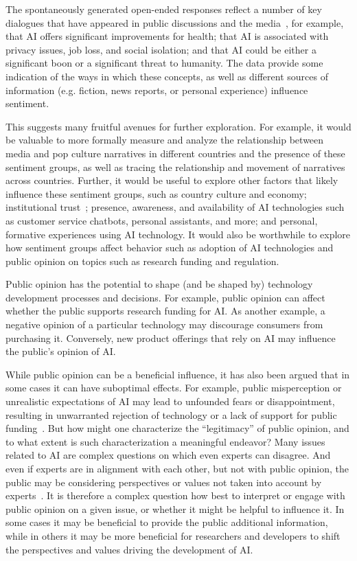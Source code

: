 \documentclass[11pt]{article} %
\begin{document}
The spontaneously generated open-ended responses reflect a number of key dialogues that have appeared in public discussions and the media~\cite{cave2018portrayals,chuan2019,stone2016artificial,ouchchy2020}, for example, that AI offers significant improvements for health; that AI is associated with privacy issues, job loss, and social isolation; and that AI could be either a significant boon or a significant threat to humanity. The data provide some indication of the ways in which these concepts, as well as different sources of information  (e.g. fiction, news reports, or personal experience) influence sentiment.

This suggests many fruitful avenues for further exploration. For example, it would be valuable to more formally measure and analyze the relationship between media and pop culture narratives in different countries and the presence of these sentiment groups, as well as tracing the relationship and movement of narratives across countries. Further, it would be useful to explore other factors that likely influence these sentiment groups, such as country culture and economy; institutional trust~\cite{chen2020,zhang2022}; presence, awareness, and availability of AI technologies such as customer service chatbots, personal assistants, and more; and personal, formative experiences using AI technology. It would also be worthwhile to explore how sentiment groups affect behavior such as adoption of AI technologies and public opinion on topics such as research funding and regulation.

Public opinion has the potential to shape (and be shaped by) technology development processes and decisions. For example, public opinion can affect whether the public supports research funding for AI. As another example, a negative opinion of a particular technology may discourage consumers from purchasing it. Conversely, new product offerings that rely on AI may influence the public's opinion of AI.

While public opinion can be a beneficial influence, it has also been argued that in some cases it can have suboptimal effects. For example, public misperception or unrealistic expectations of AI may lead to unfounded fears or disappointment, resulting in unwarranted rejection of technology or a lack of support for public funding~\cite{blumberg2019, cave2018portrayals}. But how might one characterize the ``legitimacy'' of public opinion, and to what extent is such characterization a meaningful endeavor? Many issues related to AI are complex questions on which even experts can disagree. And even if experts are in alignment with each other, but not with public opinion, the public may be considering perspectives or values not taken into account by experts~\cite{zhang2022}. It is therefore a complex question how best to interpret or engage with public opinion on a given issue, or whether it might be helpful to influence it. In some cases it may be beneficial to provide the public additional information, while in others it may be more beneficial for researchers and developers to shift the perspectives and values driving the development of AI.
\end{document}
